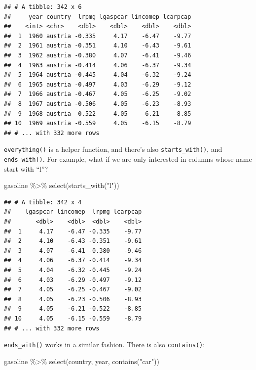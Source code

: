 \documentclass[
]{article}
\newenvironment{Shaded}{\begin{snugshade}}{\end{snugshade}}
\newcommand{\FunctionTok}[1]{\textcolor[rgb]{0.00,0.00,0.00}{#1}}
\newcommand{\NormalTok}[1]{#1}
\newcommand{\SpecialCharTok}[1]{\textcolor[rgb]{0.00,0.00,0.00}{#1}}
\newcommand{\StringTok}[1]{\textcolor[rgb]{0.31,0.60,0.02}{#1}}
\begin{document}
\begin{verbatim}
## # A tibble: 342 x 6
##     year country  lrpmg lgaspcar lincomep lcarpcap
##    <int> <chr>    <dbl>    <dbl>    <dbl>    <dbl>
##  1  1960 austria -0.335     4.17    -6.47    -9.77
##  2  1961 austria -0.351     4.10    -6.43    -9.61
##  3  1962 austria -0.380     4.07    -6.41    -9.46
##  4  1963 austria -0.414     4.06    -6.37    -9.34
##  5  1964 austria -0.445     4.04    -6.32    -9.24
##  6  1965 austria -0.497     4.03    -6.29    -9.12
##  7  1966 austria -0.467     4.05    -6.25    -9.02
##  8  1967 austria -0.506     4.05    -6.23    -8.93
##  9  1968 austria -0.522     4.05    -6.21    -8.85
## 10  1969 austria -0.559     4.05    -6.15    -8.79
## # ... with 332 more rows
\end{verbatim}

\texttt{everything()} is a helper function, and there's also \texttt{starts\_with()}, and \texttt{ends\_with()}. For
example, what if we are only interested in columns whose name start with ``l''?

\begin{Shaded}
\begin{Highlighting}[]
\NormalTok{gasoline }\SpecialCharTok{\%\textgreater{}\%}
  \FunctionTok{select}\NormalTok{(}\FunctionTok{starts\_with}\NormalTok{(}\StringTok{"l"}\NormalTok{))}
\end{Highlighting}
\end{Shaded}

\begin{verbatim}
## # A tibble: 342 x 4
##    lgaspcar lincomep  lrpmg lcarpcap
##       <dbl>    <dbl>  <dbl>    <dbl>
##  1     4.17    -6.47 -0.335    -9.77
##  2     4.10    -6.43 -0.351    -9.61
##  3     4.07    -6.41 -0.380    -9.46
##  4     4.06    -6.37 -0.414    -9.34
##  5     4.04    -6.32 -0.445    -9.24
##  6     4.03    -6.29 -0.497    -9.12
##  7     4.05    -6.25 -0.467    -9.02
##  8     4.05    -6.23 -0.506    -8.93
##  9     4.05    -6.21 -0.522    -8.85
## 10     4.05    -6.15 -0.559    -8.79
## # ... with 332 more rows
\end{verbatim}

\texttt{ends\_with()} works in a similar fashion. There is also \texttt{contains()}:

\begin{Shaded}
\begin{Highlighting}[]
\NormalTok{gasoline }\SpecialCharTok{\%\textgreater{}\%}
  \FunctionTok{select}\NormalTok{(country, year, }\FunctionTok{contains}\NormalTok{(}\StringTok{"car"}\NormalTok{))}
\end{Highlighting}
\end{Shaded}
\end{document}
